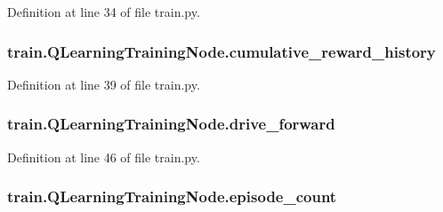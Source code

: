 Definition at line 34 of file train.\+py.

\subsubsection[{\texorpdfstring{cumulative\+\_\+reward\+\_\+history}{cumulative_reward_history}}]{\setlength{\rightskip}{0pt plus 5cm}train.\+Q\+Learning\+Training\+Node.\+cumulative\+\_\+reward\+\_\+history}\hypertarget{classtrain_1_1_q_learning_training_node_aa25b9712eebb6aed6befa421814472b4}{}\label{classtrain_1_1_q_learning_training_node_aa25b9712eebb6aed6befa421814472b4}


Definition at line 39 of file train.\+py.

\subsubsection[{\texorpdfstring{drive\+\_\+forward}{drive_forward}}]{\setlength{\rightskip}{0pt plus 5cm}train.\+Q\+Learning\+Training\+Node.\+drive\+\_\+forward}\hypertarget{classtrain_1_1_q_learning_training_node_a400f047c3086a321f255b2405f2ebe1f}{}\label{classtrain_1_1_q_learning_training_node_a400f047c3086a321f255b2405f2ebe1f}


Definition at line 46 of file train.\+py.

\subsubsection[{\texorpdfstring{episode\+\_\+count}{episode_count}}]{\setlength{\rightskip}{0pt plus 5cm}train.\+Q\+Learning\+Training\+Node.\+episode\+\_\+count}\hypertarget{classtrain_1_1_q_learning_training_node_a5bef341c2aa0b019a190efb961701cdc}{}\label{classtrain_1_1_q_learning_training_node_a5bef341c2aa0b019a190efb961701cdc}



